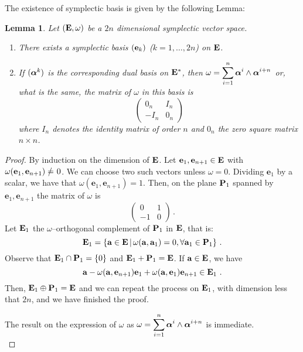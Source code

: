 \documentclass[12pt]{report}
\newtheorem{lem}[teor]{Lemma}
\def\dst{\displaystyle}
\def\qed{\ifvmode\removelastskip\fi
{\unskip\nobreak\hfil\penalty50\hbox{}\nobreak\hfil
\hbox{\vrule height1.2ex width1.2ex}\parfillskip=0pt
\finalhyphendemerits=0 \par\smallskip}}
\renewcommand{\neq}{=\hspace{-3.5mm}/\hspace{2mm}}
\begin{document}
The existence of symplectic basis is given by the following Lemma: 
\begin{lem}
Let $({\bf E},\omega)$ be a $2n$ dimensional symplectic vector space.
\begin{enumerate}
\item There exists a symplectic basis $({\bf e}_k)$ ($k=1,\ldots ,2n$) on ${\bf E}$.

\item If $(\mbox{\boldmath $\alpha$}^k)$ is the corresponding dual basis on ${\bf E}^*$,
then
\(\dst\omega=\sum_{i=1}^n\mbox{\boldmath $\alpha$}^i\wedge\mbox{\boldmath $\alpha$}^{i+n}\) or,
what is the same, the matrix of $\omega$ in this basis is
$$
\left(\begin{matrix} 0_n & I_n \\ -I_n & 0_n \end{matrix}\right)
$$
where $I_n$ denotes the identity matrix of order $n$ and $0_n$ the zero square matrix $n\times n$.
\end{enumerate}
\label{lemaaux}
\end{lem}
\begin{proof}
By induction on the dimension of ${\bf E}$. Let $\mathbf{e}_{1},\mathbf{e}_{n+1}\in{\bf E}$ with  $\omega(\mathbf{e}_{1},\mathbf{e}_{n+1})\neq 0$. We can choose two such vectors unless $\omega=0$. Dividing $\mathbf{e}_{1}$ by a scalar, we have that $\omega(\mathbf{e}_{1},\mathbf{e}_{n+1})=1$. Then, on the plane ${\bf P}_{1}$ spanned by $\mathbf{e}_{1},\mathbf{e}_{n+1}$ the matrix of $\omega$ is 
$$
\left(\begin{matrix} 0 & 1 \\ -1 & 0 \end{matrix}\right)\, .
$$
Let ${\bf E}_{1}$ the $\omega$--orthogonal complement of ${\bf P}_{1}$ in ${\bf E}$, that is:
$$
{\bf E}_{1}=\{{\bf a}\in{\bf E}\,|\, \omega({\bf a},{\bf a}_{1})=0, \forall{\bf a}_{1}\in{\bf P}_{1}\}\ .
$$
Observe that ${\bf E}_{1}\cap{\bf P}_{1}=\{0\}$ and ${\bf E}_{1}+{\bf P}_{1}={\bf E}$. If $\mathbf{a}\in{\bf E}$, we have
$$
\mathbf{a}-\omega({\bf a},{\bf e}_{n+1}){\bf e}_{1}+\omega({\bf a},{\bf e}_{1}){\bf e}_{n+1}\in{\bf E}_{1}\ .
$$
Then, ${\bf E}_{1}\oplus{\bf P}_{1}={\bf E}$ and we can repeat the process on ${\bf E}_{1}$, with dimension less that $2n$, and we have finished the proof.

The result on the expression of $\omega$ as \(\dst\omega=\sum_{i=1}^n\mbox{\boldmath $\alpha$}^i\wedge\mbox{\boldmath $\alpha$}^{i+n}\) is immediate.
\\ \qed  \end{proof}
\end{document}
